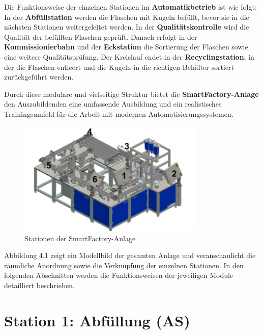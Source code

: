 Die Funktionsweise der einzelnen Stationen im \textbf{Automatikbetrieb} ist wie folgt: In der \textbf{Abfüllstation} werden die Flaschen mit 
Kugeln befüllt, bevor sie in die nächsten Stationen weitergeleitet werden. In der \textbf{Qualitätskontrolle} wird die Qualität der befüllten 
Flaschen geprüft. Danach erfolgt in der \textbf{Kommissionierbahn} und der \textbf{Eckstation} die Sortierung der Flaschen sowie eine weitere 
Qualitätsprüfung. Der Kreislauf endet in der \textbf{Recyclingstation}, in der die Flaschen entleert und die Kugeln in die richtigen Behälter 
sortiert zurückgeführt werden.

Durch diese modulare und vielseitige Struktur bietet die \textbf{SmartFactory-Anlage} den Auszubildenden eine umfassende Ausbildung und ein 
realistisches Trainingsumfeld für die Arbeit mit modernen Automatisierungssystemen.

\begin{figure}[h!] %
    \centering  
    \includegraphics[width=0.8\textwidth]{figures/Abfüllung.png}
    \caption{Stationen der SmartFactory-Anlage\cite{siemens2022}} 
    \label{fig:Stationen_SmartFactory} %
    \vspace{0.5em} %
    \small %
\end{figure}

Abbildung 4.1 zeigt ein Modellbild der gesamten Anlage und veranschaulicht die räumliche Anordnung sowie die Verknüpfung der einzelnen Stationen. 
In den folgenden Abschnitten werden die Funktionsweisen der jeweiligen Module detailliert beschrieben.

\section{Station 1: Abfüllung (AS)}\label{sec:Station 2: Abfüllung}


